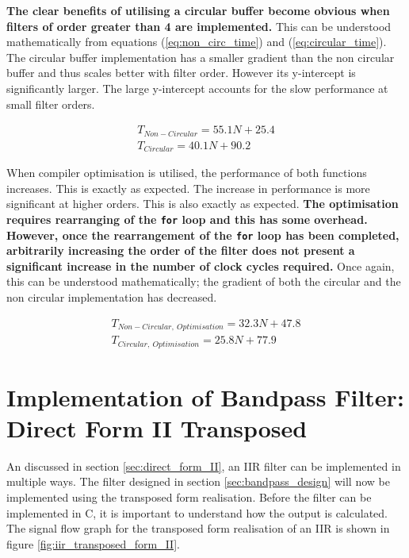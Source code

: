 \documentclass{article}
\begin{document}
\textbf{The clear benefits of utilising a circular buffer become obvious when filters of order greater than 4 are implemented.} This can be understood mathematically from equations (\ref{eq:non_circ_time}) and (\ref{eq:circular_time}). The circular buffer implementation has a smaller gradient than the non circular buffer and thus scales better with filter order. However its y-intercept is significantly larger. The large y-intercept accounts for the slow performance at small filter orders. 

\begin{align}
    T_{Non-Circular} = 55.1N + 25.4 \label{eq:non_circ_time}\\
    T_{Circular} = 40.1N +90.2\label{eq:circular_time}
\end{align}

When compiler optimisation is utilised, the performance of both functions increases. This is exactly as expected. The increase in performance is more significant at higher orders. This is also exactly as expected. \textbf{The optimisation requires rearranging of the {\tt for} loop and this has some overhead. However, once the rearrangement of the {\tt for} loop has been completed, arbitrarily increasing the order of the filter does not present a significant increase in the number of clock cycles required.} Once again, this can be understood mathematically; the gradient of both the circular and the non circular implementation has decreased.

\begin{align}
    T_{Non-Circular,\ Optimisation} = 32.3N + 47.8 \label{eq:non_circ_time}\\
    T_{Circular,\ Optimisation} = 25.8N +77.9\label{eq:circular_time}
\end{align}


\newpage
\section{Implementation of Bandpass Filter: Direct Form II Transposed}
An discussed in section \ref{sec:direct_form_II}, an IIR filter can be implemented in multiple ways. The filter designed in section \ref{sec:bandpass_design} will now be implemented using the transposed form realisation. Before the filter can be implemented in C, it is important to understand how the output is calculated.\\

The signal flow graph for the transposed form realisation of an IIR is shown in figure \ref{fig:iir_transposed_form_II}.
\end{document}
